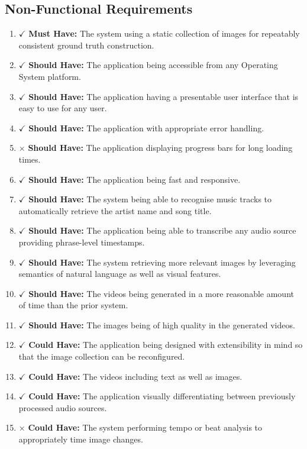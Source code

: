 \documentclass{l4proj}
\begin{document}
\subsection{Non-Functional Requirements}
\begin{enumerate}[resume]
    \color{ForestGreen}
    \item $\checkmark$ \textbf{Must Have:} The system using a static collection of images for repeatably consistent ground truth construction.
    \item $\checkmark$ \textbf{Should Have:} The application being accessible from any Operating System platform.
    \item $\checkmark$ \textbf{Should Have:} The application having a presentable user interface that is easy to use for any user.
    \item $\checkmark$ \textbf{Should Have:} The application with appropriate error handling.
    \item {\color{brickred} $\times$  \textbf{Should Have:} The application displaying progress bars for long loading times.}
    \item $\checkmark$ \textbf{Should Have:} The application being fast and responsive.
    \item $\checkmark$ \textbf{Should Have:} The system being able to recognise music tracks to automatically retrieve the artist name and song title.
    \item $\checkmark$ \textbf{Should Have:} The application being able to transcribe any audio source providing phrase-level timestamps.
    \item $\checkmark$ \textbf{Should Have:} The system retrieving more relevant images by leveraging semantics of natural language as well as visual features.
    \item $\checkmark$ \textbf{Should Have:} The videos being generated in a more reasonable amount of time than the prior system.
    \item $\checkmark$ \textbf{Should Have:} The images being of high quality in the generated videos.
    \item $\checkmark$ \textbf{Could Have:} The application being designed with extensibility in mind so that the image collection can be reconfigured.
    \item $\checkmark$ \textbf{Could Have:} The videos including text as well as images.
    \item $\checkmark$ \textbf{Could Have:} The application visually differentiating between previously processed audio sources.
    \item {\color{brickred} $\times$  \textbf{Could Have:} The system performing tempo or beat analysis to appropriately time image changes.}
\end{enumerate}
\end{document}
